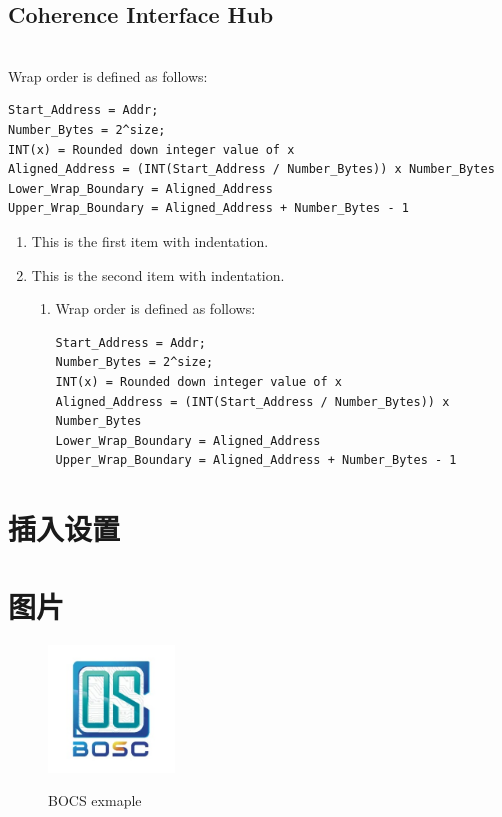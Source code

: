     \subsection*{\textbf{Coherence Interface Hub}}
    \lipsum[1]\\
    Wrap order is defined as follows:
          \begin{lstlisting}
Start_Address = Addr;
Number_Bytes = 2^size;
INT(x) = Rounded down integer value of x
Aligned_Address = (INT(Start_Address / Number_Bytes)) x Number_Bytes 
Lower_Wrap_Boundary = Aligned_Address
Upper_Wrap_Boundary = Aligned_Address + Number_Bytes - 1
          \end{lstlisting}
    \lipsum[1]
    \begin{enumerate}
      \item This is the first item with indentation.
      \item This is the second item with indentation.
      \begin{enumerate}
          \item Wrap order is defined as follows:
          \begin{lstlisting}
Start_Address = Addr;
Number_Bytes = 2^size;
INT(x) = Rounded down integer value of x
Aligned_Address = (INT(Start_Address / Number_Bytes)) x Number_Bytes 
Lower_Wrap_Boundary = Aligned_Address
Upper_Wrap_Boundary = Aligned_Address + Number_Bytes - 1
          \end{lstlisting}
      \end{enumerate}
    \end{enumerate}

\section{插入设置}
    \lipsum[1]

\section{图片}
    \lipsum[1]
    \begin{figure}
        \centering
        \includegraphics[width=0.3\textwidth]{chapter1/figures/bosc_logo.jpeg}
        \label{fig:my_label}
        \caption{BOCS exmaple}
    \end{figure}
